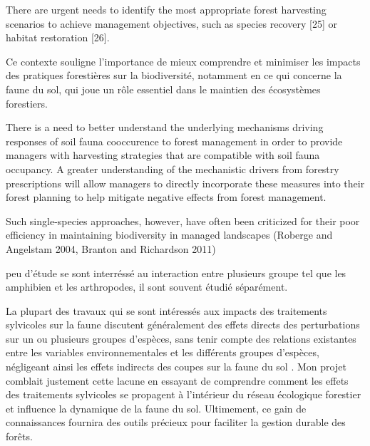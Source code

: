 There are urgent needs to identify the most appropriate forest harvesting scenarios to achieve management objectives, such as species recovery [25] or habitat restoration [26].

Ce contexte souligne l'importance de mieux comprendre et minimiser les impacts des pratiques forestières sur la biodiversité, notamment en ce qui concerne la faune du sol, qui joue un rôle essentiel dans le maintien des écosystèmes forestiers.


There is a need to better understand the underlying mechanisms driving responses of soil fauna cooccurence to forest management in order to provide managers with harvesting strategies that are compatible with soil fauna occupancy.
A greater understanding of the mechanistic drivers from forestry prescriptions will allow managers to directly incorporate these measures into their forest planning to help mitigate negative effects from forest management.

Such single-species approaches, however, have often been criticized for their poor efficiency in maintaining biodiversity in managed landscapes (Roberge and Angelstam 2004, Branton and Richardson 2011)

peu d'étude se sont interréssé au interaction entre plusieurs groupe tel que les amphibien et les arthropodes, il sont souvent étudié séparément.

La plupart des travaux qui se sont intéressés aux impacts des traitements sylvicoles sur la faune discutent généralement des effets directs des perturbations sur un ou plusieurs groupes d'espèces, 
sans tenir compte des relations existantes entre les variables environnementales et les différents groupes d'espèces, 
négligeant ainsi les effets indirects des coupes sur la faune du sol \citep{josephIntegratingOccupancyModels2016,Pollierer2021Diversityfunctional,Kudrin2023metaanalysiseffects}. 
Mon projet comblait justement cette lacune en essayant de comprendre comment les effets des traitements sylvicoles se propagent à l’intérieur du réseau écologique forestier et influence la dynamique de la faune du sol.  
Ultimement, ce gain de connaissances fournira des outils précieux pour faciliter la gestion durable des forêts.




